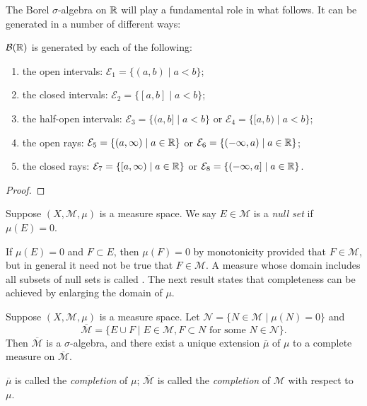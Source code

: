 The Borel $\sigma$-algebra on $\mathbb R$ will play a fundamental role in what follows. It can be generated in a number of different ways:

\begin{proposition}
$\mathcal{B}(\mathbb R)$ is generated by each of the following:
\begin{enumerate}[label=(\roman*)]
\item the open intervals: $\mathcal{E}_1=\{(a,b)\mid a<b\}$;
\item the closed intervals: $\mathcal{E}_2=\{[a,b]\mid a<b\}$;
\item the half-open intervals: $\mathcal{E}_3=\{(a,b]\mid a<b\}$ or $\mathcal{E}_4=\{[a,b)\mid a<b\}$;
\item the open rays: $\mathcal{E}_5=\{(a,\infty)\mid a\in\mathbb R\}$ or $\mathcal{E}_6=\{(-\infty,a)\mid a\in\mathbb R\}$;
\item the closed rays: $\mathcal{E}_7=\{[a,\infty)\mid a\in\mathbb R\}$ or $\mathcal{E}_8=\{(-\infty,a]\mid a\in\mathbb R\}$.
\end{enumerate}
\end{proposition}

\begin{proof}

\end{proof}

Suppose $(X,\mathcal{M},\mu)$ is a measure space. We say $E\in\mathcal{M}$ is a \emph{null set} if $\mu(E)=0$. 

If $\mu(E)=0$ and $F\subset E$, then $\mu(F)=0$ by monotonicity provided that $F\in\mathcal{M}$, but in general it need not be true that $F\in\mathcal{M}$.
A measure whose domain includes all subsets of null sets is called .
The next result states that completeness can be achieved by enlarging the domain of $\mu$.

\begin{proposition}
Suppose $(X,\mathcal{M},\mu)$ is a measure space. Let $\mathcal{N}=\{N\in\mathcal{M}\mid\mu(N)=0\}$ and
\[\overline{\mathcal{M}}=\{E\cup F\mid E\in\mathcal{M},F\subset N\text{ for some }N\in\mathcal{N}\}.\]
Then $\overline{\mathcal{M}}$ is a $\sigma$-algebra, and there exist a unique extension $\overline{\mu}$ of $\mu$ to a complete measure on $\overline{\mathcal{M}}$.
\end{proposition}

$\overline{\mu}$ is called the \emph{completion} of $\mu$; $\overline{\mathcal{M}}$ is called the \emph{completion} of $\mathcal{M}$ with respect to $\mu$.

